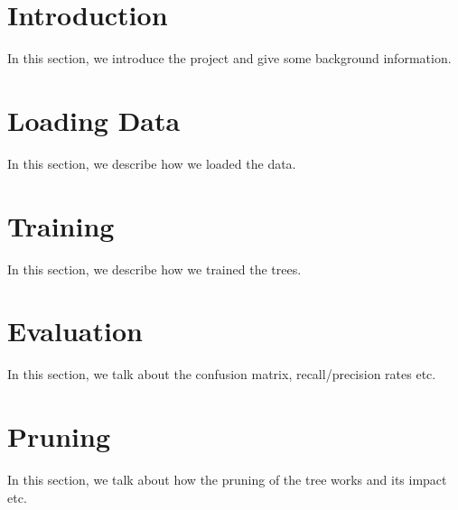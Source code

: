 \documentclass[12pt]{article}
\begin{document}
\maketitle


\section{Introduction}
In this section, we introduce the project and give some background information.

\section{Loading Data}\label{loading_data}
In this section, we describe how we loaded the data.

\section{Training}\label{training}
In this section, we describe how we trained the trees.

\section{Evaluation}\label{evaluation}
In this section, we talk about the confusion matrix, recall/precision rates etc.

\section{Pruning}\label{pruning}
In this section, we talk about how the pruning of the tree works and its impact etc.
\end{document}
